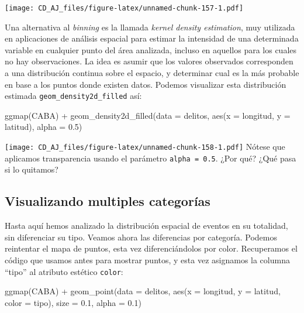 \documentclass[
]{book}
\newenvironment{Shaded}{\begin{snugshade}}{\end{snugshade}}
\newcommand{\AttributeTok}[1]{\textcolor[rgb]{0.77,0.63,0.00}{#1}}
\newcommand{\FloatTok}[1]{\textcolor[rgb]{0.00,0.00,0.81}{#1}}
\newcommand{\FunctionTok}[1]{\textcolor[rgb]{0.00,0.00,0.00}{#1}}
\newcommand{\NormalTok}[1]{#1}
\newcommand{\SpecialCharTok}[1]{\textcolor[rgb]{0.00,0.00,0.00}{#1}}
\begin{document}
\texttt{[image: CD\_AJ\_files/figure-latex/unnamed-chunk-157-1.pdf]}

Una alternativa al \emph{binning} es la llamada \emph{kernel density estimation}, muy utilizada en aplicaciones de análisis espacial para estimar la intensidad de una determinada variable en cualquier punto del área analizada, incluso en aquellos para los cuales no hay observaciones. La idea es asumir que los valores observados corresponden a una distribución continua sobre el espacio, y determinar cual es la más probable en base a los puntos donde existen datos. Podemos visualizar esta distribución estimada \texttt{geom\_density2d\_filled} así:

\begin{Shaded}
\begin{Highlighting}[]
\FunctionTok{ggmap}\NormalTok{(CABA) }\SpecialCharTok{+}
    \FunctionTok{geom\_density2d\_filled}\NormalTok{(}\AttributeTok{data =}\NormalTok{ delitos, }\FunctionTok{aes}\NormalTok{(}\AttributeTok{x =}\NormalTok{ longitud, }\AttributeTok{y =}\NormalTok{ latitud), }\AttributeTok{alpha =} \FloatTok{0.5}\NormalTok{) }
\end{Highlighting}
\end{Shaded}

\texttt{[image: CD\_AJ\_files/figure-latex/unnamed-chunk-158-1.pdf]}
Nótese que aplicamos transparencia usando el parámetro \texttt{alpha\ =\ 0.5}. ¿Por qué? ¿Qué pasa si lo quitamos?

\hypertarget{visualizando-multiples-categoruxedas}{%
\subsection{Visualizando multiples categorías}\label{visualizando-multiples-categoruxedas}}

Hasta aquí hemos analizado la distribución espacial de eventos en su totalidad, sin diferenciar su tipo. Veamos ahora las diferencias por categoría. Podemos reintentar el mapa de puntos, esta vez diferenciándolos por color. Recuperamos el código que usamos antes para mostrar puntos, y esta vez asignamos la columna ``tipo'' al atributo estético \texttt{color}:

\begin{Shaded}
\begin{Highlighting}[]
\FunctionTok{ggmap}\NormalTok{(CABA) }\SpecialCharTok{+}
    \FunctionTok{geom\_point}\NormalTok{(}\AttributeTok{data =}\NormalTok{ delitos, }
               \FunctionTok{aes}\NormalTok{(}\AttributeTok{x =}\NormalTok{ longitud, }\AttributeTok{y =}\NormalTok{ latitud, }\AttributeTok{color =}\NormalTok{ tipo),}
               \AttributeTok{size =} \FloatTok{0.1}\NormalTok{, }\AttributeTok{alpha =} \FloatTok{0.1}\NormalTok{)}
\end{Highlighting}
\end{Shaded}
\end{document}
